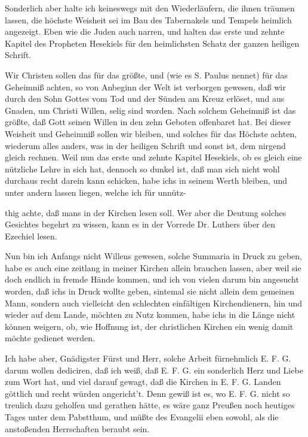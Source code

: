 Sonderlich aber halte ich keineswegs mit den Wiederläufern, die ihnen träumen lassen, die höchste Weisheit sei im Bau des Tabernakels und Tempels heimlich angezeigt. Eben wie die Juden auch narren, und halten das erste und zehnte Kapitel des Propheten Hesekiels für den heimlichsten Schatz der ganzen heiligen Schrift.

Wir Christen sollen das für das größte, und (wie es S. Paulus nennet) für das Geheimniß achten, so von Anbeginn der Welt ist verborgen gewesen, daß wir durch den Sohn Gottes vom Tod und der Sünden am Kreuz erlöset, und aus Gnaden, um Christi Willen, selig sind worden. Nach solchem Geheimniß ist das größte, daß Gott seinen Willen in den zehn Geboten offenbaret hat. Bei dieser Weisheit und Geheimniß sollen wir bleiben, und solches für das Höchste achten, wiederum alles anders, was in der heiligen Schrift und sonst ist, dem nirgend gleich rechnen. Weil nun das erste und zehnte Kapitel Hesekiels, ob es gleich eine nützliche Lehre in sich hat, dennoch so dunkel ist, daß man sich nicht wohl durchaus recht darein kann schicken, habe ichs in seinem Werth bleiben, und unter andern lassen liegen, welche ich für unnütz-


thig achte, daß mans in der Kirchen lesen soll. Wer aber die Deutung solches Gesichtes begehrt zu wissen, kann es in der Vorrede Dr. Luthers über den Ezechiel lesen.

Nun bin ich Anfangs nicht Willens gewesen, solche Summaria in Druck zu geben, habe es auch eine zeitlang in meiner Kirchen allein brauchen lassen, aber weil sie doch endlich in fremde Hände kommen, und ich von vielen darum bin angesucht worden, daß ichs in Druck wollte geben, sintemal sie nicht allein dem gemeinen Mann, sondern auch vielleicht den schlechten einfältigen Kirchendienern, hin und wieder auf dem Lande, möchten zu Nutz kommen, habe ichs in die Länge nicht können weigern, ob, wie Hoffnung ist, der christlichen Kirchen ein wenig damit möchte gedienet werden.

Ich habe aber, Gnädigster Fürst und Herr, solche Arbeit fürnehmlich E. F. G. darum wollen dediciren, daß ich weiß, daß E. F. G. ein sonderlich Herz und Liebe zum Wort hat, und viel darauf gewagt, daß die Kirchen in E. F. G. Landen göttlich und recht würden angericht't. Denn gewiß ist es, wo E. F. G. nicht so treulich dazu geholfen und gerathen hätte, es wäre ganz Preußen noch heutiges Tages unter dem Pabstthum, und müßte des Evangelii eben sowohl, als die anstoßenden Herrschaften beraubt sein.


